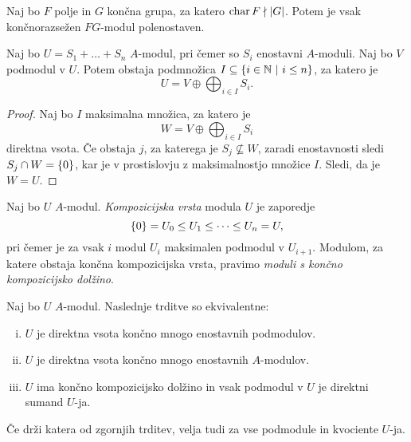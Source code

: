 \begin{posledica}
Naj bo $F$ polje in $G$ končna grupa, za katero
$\operatorname{char} F \nmid \left\lvert G\right\rvert$. Potem je vsak končnorazsežen $FG$-modul
polenostaven.
\end{posledica}

\begin{lema}\label{rep:lm:dir_sum}
Naj bo $U = S_1 + \dots + S_n$ $A$-modul, pri čemer so $S_i$
enostavni $A$-moduli. Naj bo $V$ podmodul v $U$. Potem obstaja
podmnožica $I \subseteq \left\{i \in \mathbb{N}~\middle\vert~i \leq n\right\}$, za katero je
\[
U = V \oplus \bigoplus_{i \in I} S_i.
\]
\end{lema}

\begin{proof}
Naj bo $I$ maksimalna množica, za katero je
\[
W = V \oplus \bigoplus_{i \in I} S_i
\]
direktna vsota. Če obstaja $j$, za katerega je
$S_j \not \subseteq W$, zaradi enostavnosti sledi
$S_j \cap W = \left\{0\right\}$, kar je v prostislovju z maksimalnostjo
množice $I$. Sledi, da je $W = U$.
\end{proof}

\begin{definicija}
Naj bo $U$ $A$-modul.
\emph{Kompozicijska vrsta} modula
$U$ je zaporedje
\[
\left\{0\right\} = U_0 \leq U_1 \leq \dots \leq U_n = U,
\]
pri čemer je za vsak $i$ modul $U_i$ maksimalen podmodul v
$U_{i+1}$. Modulom, za katere obstaja končna kompozicijska vrsta,
pravimo \emph{moduli s končno kompozicijsko dolžino}.
\end{definicija}

\begin{trditev}
Naj bo $U$ $A$-modul. Naslednje trditve so ekvivalentne:

\begin{enumerate}[i)]
\item $U$ je direktna vsota končno mnogo enostavnih podmodulov.
\item $U$ je direktna vsota končno mnogo enostavnih $A$-modulov.
\item $U$ ima končno kompozicijsko dolžino in vsak podmodul v $U$
je direktni sumand $U$-ja.
\end{enumerate}

Če drži katera od zgornjih trditev, velja tudi za vse podmodule in
kvociente $U$-ja.
\end{trditev}

